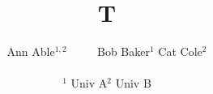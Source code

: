 \documentclass{article}
\begin{document}
\title{T}
\author{
Ann Able$^{1,2}$
$\qquad$
Bob Baker$^{1}$
\enskip
Cat Cole$^{2}$\\
\\
$^1$ Univ A\quad$^2$ Univ B
}
\maketitle
\end{document}
